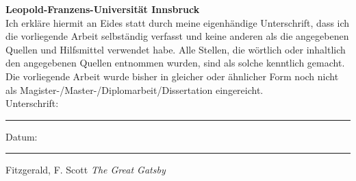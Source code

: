 \documentclass[10pt,a4paper]{book}
\numberwithin{equation}{chapter}
\numberwithin{figure}{chapter}
\numberwithin{table}{chapter}
\begin{document}
\begin{declaration}
\addchaptertocentry{\authorshipname} %

\noindent\textbf{Leopold-Franzens-Universit{\"a}t Innsbruck}\\

\noindent Ich erkl{\"a}re hiermit an Eides statt durch meine eigenh{\"a}ndige Unterschrift, dass ich die vorliegende Arbeit selbst{\"a}ndig verfasst und keine anderen als die angegebenen Quellen und Hilfsmittel verwendet habe. Alle Stellen, die w{\"o}rtlich oder inhaltlich den angegebenen Quellen entnommen wurden, sind als solche kenntlich gemacht.\\
Die vorliegende Arbeit wurde bisher in gleicher oder {\"a}hnlicher Form noch nicht als Magister-/Master-/Diplomarbeit/Dissertation eingereicht. \\
 
\noindent Unterschrift:\\
\rule[0.5em]{25em}{0.5pt} %
 
\noindent Datum:\\
\rule[0.5em]{25em}{0.5pt} %
\end{declaration}

\cleardoublepage


\vspace*{0.2\textheight}
\hfill Fitzgerald, F. Scott \textit{The Great Gatsby}

\end{document}
